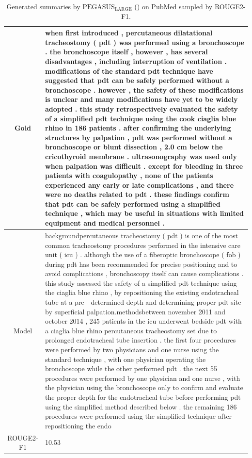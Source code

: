 \begin{table}[bth!]
\begin{tabular}{c|p{}}
\\ \hline
Gold & 
when first introduced , percutaneous dilatational tracheostomy ( pdt ) was performed using a bronchoscope . the bronchoscope itself , however , has several disadvantages , including interruption of ventilation . modifications of the standard pdt technique have suggested that pdt can be safely performed without a bronchoscope . however , the safety of these modifications is unclear and many modifications have yet to be widely adopted . this study retrospectively evaluated the safety of a simplified pdt technique using the cook ciaglia blue rhino in 186 patients . after confirming the underlying structures by palpation , pdt was performed without a bronchoscope or blunt dissection , 2.0 cm below the cricothyroid membrane . ultrasonography was used only when palpation was difficult . except for bleeding in three patients with coagulopathy , none of the patients experienced any early or late complications , and there were no deaths related to pdt . these findings confirm that pdt can be safely performed using a simplified technique , which may be useful in situations with limited equipment and medical personnel .
\\ \hline
Model & 
backgroundpercutaneous tracheostomy ( pdt ) is one of the most common tracheostomy procedures performed in the intensive care unit ( icu ) . although the use of a fiberoptic bronchoscope ( fob ) during pdt has been recommended for precise positioning and to avoid complications , bronchoscopy itself can cause complications . this study assessed the safety of a simplified pdt technique using the ciaglia blue rhino , by repositioning the existing endotracheal tube at a pre - determined depth and determining proper pdt site by superficial palpation.methodsbetween november 2011 and october 2014 , 245 patients in the icu underwent bedside pdt with a ciaglia blue rhino percutaneous tracheostomy set due to prolonged endotracheal tube insertion . the first four procedures were performed by two physicians and one nurse using the standard technique , with one physician operating the bronchoscope while the other performed pdt . the next 55 procedures were performed by one physician and one nurse , with the physician using the bronchoscope only to confirm and evaluate the proper depth for the endotracheal tube before performing pdt using the simplified method described below . the remaining 186 procedures were performed using the simplified technique after repositioning the endo
\\ \hline
ROUGE2-F1 & 
10.53
\\ \hline
\end{tabular}
\caption{Generated summaries by $\text{PEGASUS}_{\text{LARGE}}$ (\gnews) on PubMed sampled by ROUGE2-F1.}
\end{table}

